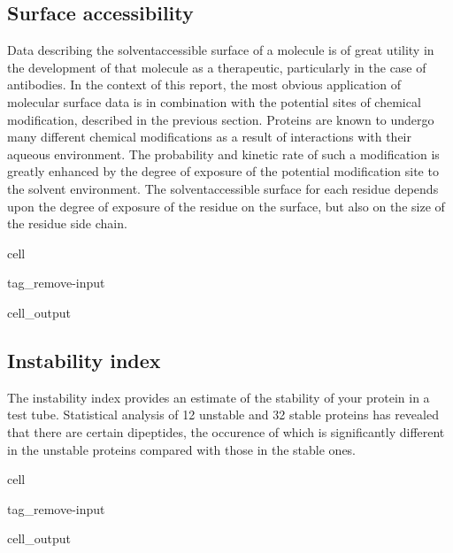 \documentclass[letterpaper,10pt,english]{jupyterBook}
\begin{document}
\subsection{Surface accessibility}
\label{\detokenize{ipynb/chapter1:surface-accessibility}}
\sphinxAtStartPar
Data describing the solvent\sphinxhyphen{}accessible surface of a molecule is of great utility in the development of that molecule as a therapeutic, particularly in the case of antibodies. In the context of this report, the most obvious application of molecular surface data is in combination with the potential sites of chemical modification, described in the previous section. Proteins are known to undergo many different chemical modifications as a result of interactions with their aqueous environment. The probability and kinetic rate of such a modification is greatly enhanced by the degree of exposure of the potential modification site to the solvent environment. The solvent\sphinxhyphen{}accessible surface for each residue depends upon the degree of exposure of the residue on the surface, but also on the size of the residue side chain.

\begin{sphinxuseclass}{cell}
\begin{sphinxuseclass}{tag_remove-input}\begin{sphinxVerbatimOutput}

\begin{sphinxuseclass}{cell_output}
\noindent{}

\end{sphinxuseclass}\end{sphinxVerbatimOutput}

\end{sphinxuseclass}
\end{sphinxuseclass}

\subsection{Instability index}
\label{\detokenize{ipynb/chapter1:instability-index}}
\sphinxAtStartPar
The instability index provides an estimate of the stability of your protein in a test tube. Statistical analysis of 12 unstable and 32 stable proteins has revealed that there are certain dipeptides, the occurence of which is significantly different in the unstable proteins compared with those in the stable ones.

\begin{sphinxuseclass}{cell}
\begin{sphinxuseclass}{tag_remove-input}\begin{sphinxVerbatimOutput}

\begin{sphinxuseclass}{cell_output}
\noindent{}

\end{sphinxuseclass}\end{sphinxVerbatimOutput}

\end{sphinxuseclass}
\end{sphinxuseclass}
\sphinxstepscope
\end{document}
